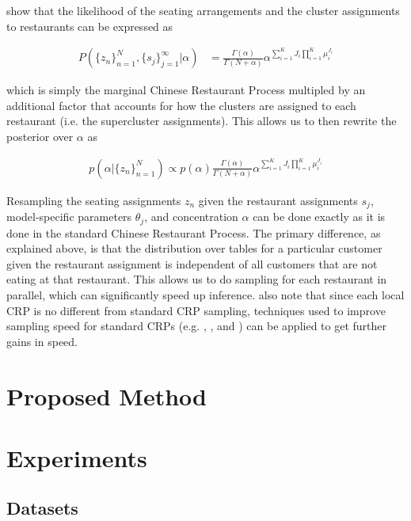 \documentclass{article}
\begin{document}
\cite{lovell2012} show that the likelihood of the seating arrangements
and the cluster assignments to restaurants can be expressed as

\begin{align}
  P(\{z_n\}_{n=1}^N, \{s_j\}_{j=1}^\infty | \alpha) &=
  \frac{\Gamma(\alpha)}{\Gamma(N + \alpha)} \alpha^{\sum_{i=1}^K J_i \prod_{i=1}^K \mu_i^{J_i}}
\end{align}

which is simply the marginal Chinese Restaurant Process multipled by
an additional factor that accounts for how the clusters are assigned
to each restaurant (i.e. the supercluster assignments). This allows us
to then rewrite the posterior over $\alpha$ as

\begin{align}
  p(\alpha | \{z_n\}_{n=1}^N) \propto p(\alpha) \frac{\Gamma(\alpha)}{\Gamma(N + \alpha)} \alpha^{\sum_{i=1}^K J_i \prod_{i=1}^K \mu_i^{J_i}}
\end{align}

Resampling the seating assignments $z_n$ given the restaurant
assignments $s_j$, model-specific parameters $\theta_j$, and
concentration $\alpha$ can be done exactly as it is done in the
standard Chinese Restaurant Process. The primary difference, as
explained above, is that the distribution over tables for a particular
customer given the restaurant assignment is independent of all
customers that are not eating at that restaurant. This allows us to do
sampling for each restaurant in parallel, which can significantly
speed up inference. \cite{lovell2012} also note that since each local
CRP is no different from standard CRP sampling, techniques used to
improve sampling speed for standard CRPs (e.g. \cite{neal2000},
\cite{walker2007}, and \cite{papaspiliopoulos2008}) can be applied to
get further gains in speed.

\section{Proposed Method}
\label{sec:proposed-method}

\section{Experiments}
\label{sec:experiments}

\subsection{Datasets}
\end{document}
